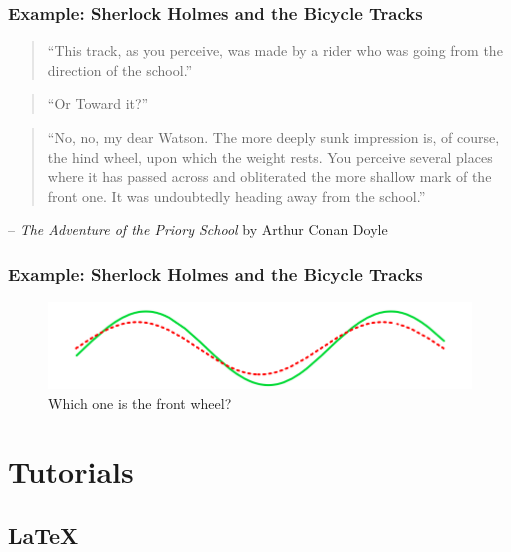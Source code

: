 \documentclass[hyperref={colorlinks=false},compress,handout,10pt]{beamer}
\begin{document}
\begin{frame}
    \frametitle{Example: Sherlock Holmes and the Bicycle Tracks}
    \begin{verse}
        ``This track, as you perceive, was made by a rider who was going from
        the direction of the school.''
    \end{verse}
    \begin{verse}
        ``Or Toward it?''
    \end{verse}
    \begin{verse}
        ``No, no, my dear Watson.  The more deeply sunk impression is, of
        course, the hind wheel, upon which the weight rests.  You perceive
        several places where it has passed across and obliterated the more
        shallow mark of the front one.  It was undoubtedly heading away from
        the school.''
    \end{verse}
    \hfill -- \textit{The Adventure of the Priory School} by Arthur Conan Doyle
\end{frame}

\begin{frame}
    \frametitle{Example: Sherlock Holmes and the Bicycle Tracks}
    \begin{figure}
        \caption{Which one is the front wheel?}
        \begin{center}
            \includegraphics[width=\textwidth]{images/sholmesbike.png}
        \end{center}
        \label{fig:sholmesbike}
    \end{figure}
\end{frame}

\section{Tutorials}

\subsection{\LaTeX}
\end{document}
